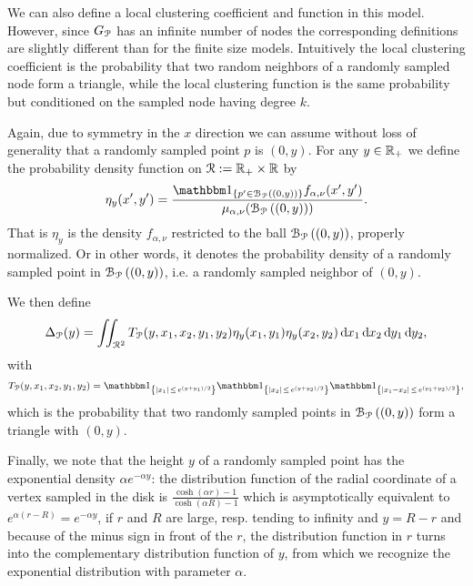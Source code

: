 We can also define a local clustering coefficient and function in this model. However, since $G_{{\mathcal P}}$ has an infinite number of nodes the corresponding definitions are slightly different than for the finite size models. Intuitively the local clustering coefficient is the probability that two random neighbors of a randomly sampled node form a triangle, while the local clustering function is the same probability but conditioned on the sampled node having degree $k$.

Again, due to symmetry in the $x$ direction we can assume without loss of generality that a randomly sampled point $p$ is $(0,y)$. For any $y \in {\ensuremath{\mathbb R}}_+$ we define the probability density function on ${\mathcal R} := {\mathbb R}_+ \times {\ensuremath{\mathbb R}}$ by  
\begin{equation}\label{eq:def_eta_P}
	\eta_y(x^\prime, y^\prime) = \frac{\ind{p^\prime \in \BallPo{(0,y)}} f_{\alpha,\nu}(x^\prime,y^\prime)}{\mu_{\alpha,\nu}(\BallPo{(0,y)})}.
\end{equation}
That is $\eta_y$ is the density $f_{\alpha,\nu}$ restricted to the ball ${\mathcal B}_{{\mathcal P}}\left((0,y)\right)$, properly normalized. Or in other words, it denotes the probability density of a randomly sampled point in ${\mathcal B}_{{\mathcal P}}\left((0,y)\right)$, i.e. a randomly sampled neighbor of $(0,y)$. 

We then define
\begin{equation}\label{eq:def_delta_p}
	\Delta_{{\mathcal P}}(y) = \iint_{{\mathcal R}^2} T_{{\mathcal P}}(y, x_1, x_2, y_1, y_2) \eta_{y}(x_1,y_1)\eta_{y}(x_2,y_2) \operatorname{\mathrm{d}\hspace{-2pt}} x_1 \operatorname{\mathrm{d}\hspace{-2pt}} x_2  \operatorname{\mathrm{d}\hspace{-2pt}} y_1  \operatorname{\mathrm{d}\hspace{-2pt}} y_2,
\end{equation}
with 
\[
	T_\Pcal(y, x_1, x_2, y_1, y_2) 
	= \ind{|x_1| \, \le \, e^{(y+y_1)/2}}\ind{|x_2| \, \le \, e^{(y+y_2)/2}}\ind{|x_1-x_2| \, \le \, e^{(y_1+y_2)/2}},
\]
which is the probability that two randomly sampled points in ${\mathcal B}_{{\mathcal P}}\left((0,y)\right)$ form a triangle with $(0,y)$.

Finally, we note that the height $y$ of a randomly sampled point has the exponential density $\alpha e^{-\alpha y}$: the distribution function of the radial coordinate of a vertex sampled in the disk is $\frac{\cosh(\alpha  r)-1}{\cosh(\alpha R)-1}$ which is asymptotically equivalent to $e^{\alpha(r-R)} = e^{-\alpha y}$, if $r$ and $R$ are large, resp. tending to infinity and $y=R-r$ and because of the minus sign in front of the $r$, the distribution function in $r$ turns into the complementary distribution function of $y$, from which we recognize the exponential distribution with parameter $\alpha$.%

